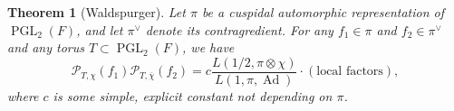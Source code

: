 \documentclass[11pt,a4paper,leqno]{article}
\let\mc\mathcal
\newcommand{\1}{\mathbbm{1}}
\renewcommand{\bar}{\overline}
\DeclareMathOperator{\Ad}{Ad}
\DeclareMathOperator{\PGL}{PGL}
\theoremstyle{plain}
\newtheorem{theorem}{Theorem}[section]
\theoremstyle{definition}
\theoremstyle{remark}
\numberwithin{equation}{section}
\begin{document}
\begin{theorem}[Waldspurger]
  Let $\pi$ be a cuspidal automorphic representation of $\PGL_{2}(F)$,
  and let $\pi^{\vee}$ denote its contragredient. For any $f_{1} \in \pi $ and
  $f_{2} \in \pi^{\vee}$ and any torus $T \subset \PGL_{2}(F)$, we have
  \begin{equation}
    \label{eq:37}
\mc P_{T,\chi}(f_{1})\mc P_{T,\bar\chi} (f_{2}) = c \frac{L(1/2, \pi\otimes
  \chi)}{L(1,\pi, \Ad)} \cdot (\text{local factors}),
  \end{equation}
where $c$ is some simple, explicit constant not depending on $\pi$.
\end{theorem}


\printbibliography%
\end{document}
